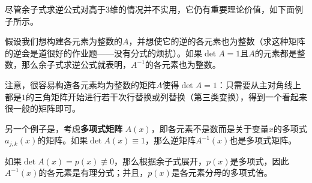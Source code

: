 尽管余子式求逆公式对高于$3$维的情况并不实用，它仍有重要理论价值，如下面例子所示。

\begin{example*}[逆的元素都是整数的矩阵]
  假设我们想构建各元素为整数的$A$，并想使它的逆的各元素也为整数（求这种矩阵的逆会是道很好的作业题——没有分式的烦扰）。如果$\det A=1$且$A$的元素都是整数，那么余子式求逆公式就表明，$A^{-1}$的各元素也为整数。

  注意，很容易构造各元素均为整数的矩阵$A$使得$\det A=1$：只需要从主对角线上都是$1$的三角矩阵开始进行若干次行替换或列替换（第三类变换），得到一个看起来很一般的矩阵即可。
\end{example*}

\begin{example*}[多项式矩阵的逆]
  另一个例子是，考虑{\bf 多项式矩阵} $A(x)$，即各元素不是数而是关于变量$x$的多项式$a_{j,k}(x)$的矩阵。如果$\det A(x)\equiv 1$，那么逆矩阵$A^{-1}(x)$也是多项式矩阵。

  如果$\det A(x)=p(x)\not\equiv 0$，那么根据余子式展开，$p(x)$是多项式，因此$A^{-1}(x)$的各元素是有理分式；并且，$p(x)$是各元素分母的多项式倍。
\end{example*}

